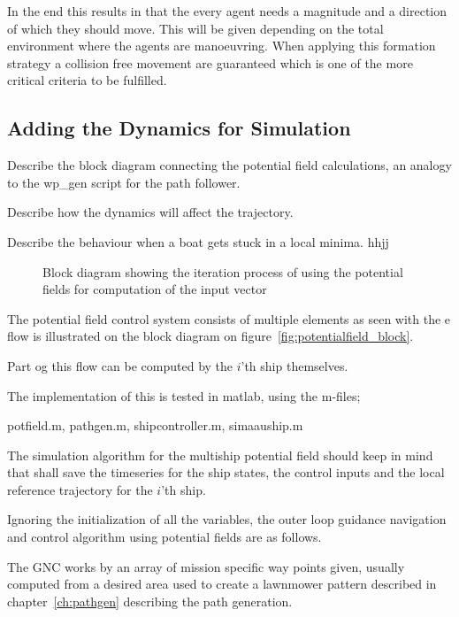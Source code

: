 In the end this results in that the every agent needs a magnitude and a direction of which they should move. This will be given depending on the total environment where the agents are manoeuvring. When applying this formation strategy a collision free movement are guaranteed which is one of the more critical criteria to be fulfilled. 

\subsection{Adding the Dynamics for Simulation}
Describe the block diagram connecting the potential field calculations,
an analogy to the wp\_gen script for the path follower.

Describe how the dynamics will affect the trajectory.

Describe the behaviour when a boat gets stuck in a local minima. hhjj

\begin{figure}[htbp]
\centering

\caption{Block diagram showing the iteration process of using the
potential fields for computation of the input vector}
\label{fig:potentialfield_block}
\end{figure}

The potential field control system consists of multiple elements
as seen with the e flow is illustrated on the block diagram on
figure~\vref{fig:potentialfield_block}.

Part og this flow can be computed by the $i$'th ship themselves.


The implementation of this is tested in matlab, using the m-files;

potfield.m, pathgen.m, shipcontroller.m, simaauship.m

The simulation algorithm for the multiship potential field should keep
in mind that shall save the timeseries for the ship states, the
control inputs and the local reference trajectory for the $i$'th ship.

Ignoring the initialization of all the variables, the outer loop
guidance navigation and control algorithm using potential fields are
as follows.

The \ac{GNC} works by an array of mission specific way points given,
usually computed from a desired area used to create a lawnmower
pattern described in chapter~\vref{ch:pathgen} describing the path
generation.

